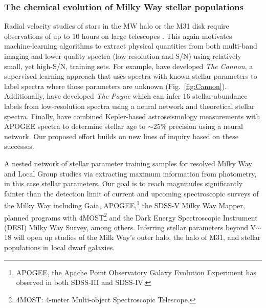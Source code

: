 \subsubsection{The chemical evolution of Milky Way stellar populations}
Radial velocity studies of stars in the MW halo or the M31 disk require
observations of up to 10 hours on large telescopes
\citep[e.g.,][]{2018arXiv180904082C}.  This again motivates
machine-learning algorithms to extract physical quantities from both
multi-band imaging and lower quality spectra (low resolution and S/N)
using relatively small, yet high-S/N, training sets.  For example,
\citet{2015ApJ...808...16N} have developed {\it The Cannon}, a
supervised learning approach that uses spectra with known stellar
parameters to label spectra where those parameters are unknown
(Fig.~\ref{fig:Cannon}).  Additionally, \citet{2018arXiv180401530T} have
developed {\it The Payne} which can infer 16 stellar-abundance labels
from low-resolution spectra using a neural network and theoretical
stellar spectra.  Finally, \citet{2018arXiv180803278T} have combined
Kepler-based astroseismology measurements with APOGEE spectra to
determine stellar age to $\sim$25\% precision using a neural network.
Our proposed effort builds on new lines of inquiry based on these
successes.

A nested network of stellar parameter training samples for resolved
Milky Way and Local Group studies via extracting maximum information
from photometry, in this case stellar parameters. Our goal is to
reach magnitudes significantly fainter than the detection limit of
current and upcoming spectroscopic surveys of the Milky Way including
Gaia, APOGEE,\footnote{APOGEE, the Apache Point Observatory Galaxy
Evolution Experiment has observed in both SDSS-III and SDSS-IV.} the
SDSS-V Milky Way Mapper, planned programs with 4MOST\footnote{4MOST:
4-meter Multi-object Spectroscopic Telescope.} and the Dark Energy
Spectroscopic Instrument (DESI) Milky Way Survey, among others.
Inferring stellar parameters beyond V$\sim$18 will open up studies of
the Milk Way's outer halo, the halo of M31, and stellar populations
in local dwarf galaxies.

